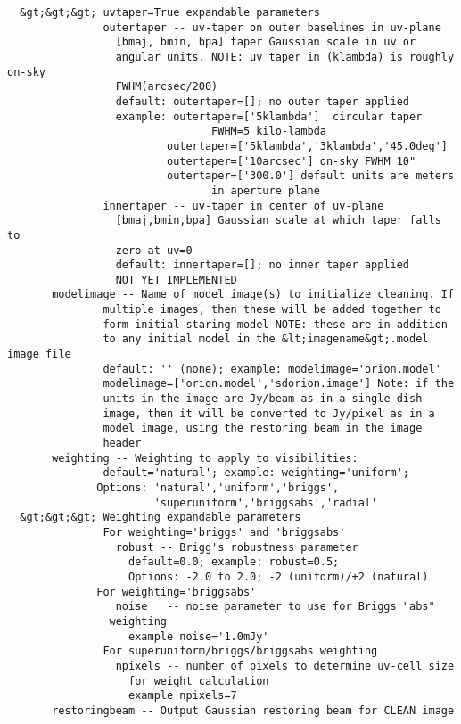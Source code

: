 \begin{verbatim}
  &gt;&gt;&gt; uvtaper=True expandable parameters
               outertaper -- uv-taper on outer baselines in uv-plane
                 [bmaj, bmin, bpa] taper Gaussian scale in uv or 
                 angular units. NOTE: uv taper in (klambda) is roughly on-sky 
                 FWHM(arcsec/200)
                 default: outertaper=[]; no outer taper applied
                 example: outertaper=['5klambda']  circular taper 
                                FWHM=5 kilo-lambda
                         outertaper=['5klambda','3klambda','45.0deg']
                         outertaper=['10arcsec'] on-sky FWHM 10"
                         outertaper=['300.0'] default units are meters 
                                in aperture plane
               innertaper -- uv-taper in center of uv-plane
                 [bmaj,bmin,bpa] Gaussian scale at which taper falls to 
                 zero at uv=0
                 default: innertaper=[]; no inner taper applied
                 NOT YET IMPLEMENTED                
       modelimage -- Name of model image(s) to initialize cleaning. If
               multiple images, then these will be added together to
               form initial staring model NOTE: these are in addition
               to any initial model in the &lt;imagename&gt;.model image file
               default: '' (none); example: modelimage='orion.model'
               modelimage=['orion.model','sdorion.image'] Note: if the
               units in the image are Jy/beam as in a single-dish
               image, then it will be converted to Jy/pixel as in a
               model image, using the restoring beam in the image
               header
       weighting -- Weighting to apply to visibilities:
               default='natural'; example: weighting='uniform';
              Options: 'natural','uniform','briggs', 
                       'superuniform','briggsabs','radial'
  &gt;&gt;&gt; Weighting expandable parameters
               For weighting='briggs' and 'briggsabs'
                 robust -- Brigg's robustness parameter
                   default=0.0; example: robust=0.5;
                   Options: -2.0 to 2.0; -2 (uniform)/+2 (natural)
              For weighting='briggsabs'
                 noise   -- noise parameter to use for Briggs "abs" 
                weighting
                   example noise='1.0mJy'
               For superuniform/briggs/briggsabs weighting
                 npixels -- number of pixels to determine uv-cell size
                   for weight calculation
                   example npixels=7
       restoringbeam -- Output Gaussian restoring beam for CLEAN image

\end{verbatim}
